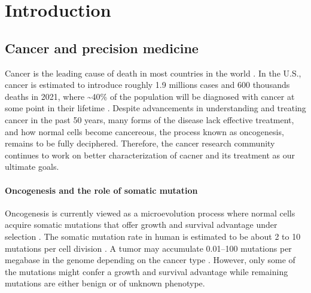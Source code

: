 \chapter{Introduction}
\label{chap:intro}











\section{Cancer and precision medicine}
Cancer is the leading cause of death in most countries in the world \cite{sungh_brayf:GlobalCancer2021}. In the U.S., cancer is estimated to introduce roughly 1.9 millions cases and 600 thousands deaths in 2021, where \textasciitilde40\% of the population will be diagnosed with cancer at some point in their lifetime \cite{siegelrl_jemala:CancerStatistics2021}. Despite advancements in understanding and treating cancer in the past 50 years, many forms of the disease lack effective treatment, and how normal cells become cancereous, the process known as oncogenesis, remains to be fully deciphered. Therefore, the cancer research community continues to work on better characterization of cacner and its treatment as our ultimate goals.



\subsubsection{Oncogenesis and the role of somatic mutation}
Oncogenesis is currently viewed as a microevolution process where normal cells acquire somatic mutations that offer growth and survival advantage under selection \cite{strattonmr_futrealpa:CancerGenome2009,martincorenai_campbellpj:SomaticMutation2015}. The somatic mutation rate in human is estimated to be about 2 to 10 mutations per cell division \cite{lynchm_lynchm:RateMolecular2010,milhollandb_vijgj:DifferencesGermline2017}. A tumor may accumulate 0.01--100 mutations per megabase in the genome depending on the cancer type \cite{lawrencems_getzg:MutationalHeterogeneity2013,martincorenai_campbellpj:SomaticMutation2015}. However, only some of the mutations might confer a growth and survival advantage while remaining mutations are either benign or of unknown phenotype.

